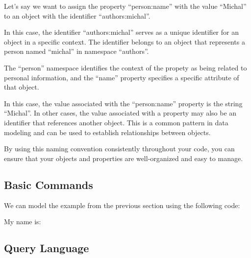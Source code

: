 \documentclass{ltxdoc}
\begin{document}
Let's say we want to assign the property \enquote{person:name} with the value \enquote{Michal}
to an object with the identifier \enquote{authors:michal}. 


In this case, the identifier \enquote{authors:michal} serves as a unique
identifier for an object in a specific context. The identifier
belongs to an object that represents a person named \enquote{michal} in namespace \enquote{authors}.

The \enquote{person} namespace identifies the context of the propety as
being related to personal information, and the \enquote{name} property specifies a
specific attribute of that object. 

In this case, the value associated with the \enquote{person:name} property is the
string \enquote{Michal}. In other cases, the value associated with a property may also
be an identifier that references another object. This is a common pattern in
data modeling and can be used to establish relationships between objects.


By using this naming convention consistently
throughout your code, you can ensure that your objects and properties are
well-organized and easy to manage.





\subsection{Basic Commands}


We can model the example from the previous section using the following code:

\begin{LTXexample}[pos=b]
  My name is: 

\end{LTXexample}


\subsection{Query Language}
\end{document}
